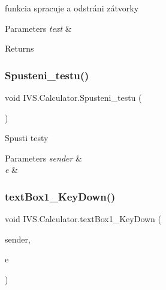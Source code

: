 funkcia spracuje a odstráni zátvorky 


\begin{DoxyParams}{Parameters}
{\em text} & \\
\hline
\end{DoxyParams}
\begin{DoxyReturn}{Returns}

\end{DoxyReturn}
\mbox{\label{class_i_v_s_1_1_calculator_a0ce50422b2626bc722577bf9e6b31469}} 
\subsubsection{\texorpdfstring{Spusteni\+\_\+testu()}{Spusteni\_testu()}}
{\footnotesize\ttfamily void I\+V\+S.\+Calculator.\+Spusteni\+\_\+testu (\begin{DoxyParamCaption}{ }\end{DoxyParamCaption})\hspace{0.3cm}{\ttfamily [protected]}}



Spusti testy 


\begin{DoxyParams}{Parameters}
{\em sender} & \\
\hline
{\em e} & \\
\hline
\end{DoxyParams}
\mbox{\label{class_i_v_s_1_1_calculator_a060bd753428b6aff7325f535a6c5445f}} 
\subsubsection{\texorpdfstring{text\+Box1\+\_\+\+Key\+Down()}{textBox1\_KeyDown()}}
{\footnotesize\ttfamily void I\+V\+S.\+Calculator.\+text\+Box1\+\_\+\+Key\+Down (\begin{DoxyParamCaption}\item[{object}]{sender,  }\item[{Key\+Event\+Args}]{e }\end{DoxyParamCaption})\hspace{0.3cm}{\ttfamily [protected]}}



